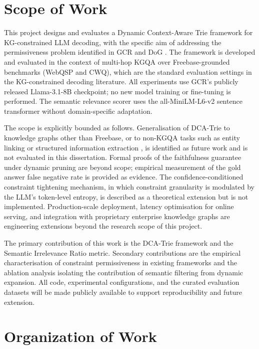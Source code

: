 \section{Scope of Work}

This project designs and evaluates a Dynamic Context-Aware Trie framework for KG-constrained LLM decoding, with the specific aim of addressing the permissiveness problem identified in GCR \citep{luo2024gcr} and DoG \citep{li2024dog}. The framework is developed and evaluated in the context of multi-hop KGQA over Freebase-grounded benchmarks (WebQSP and CWQ), which are the standard evaluation settings in the KG-constrained decoding literature. All experiments use GCR's publicly released Llama-3.1-8B checkpoint; no new model training or fine-tuning is performed. The semantic relevance scorer uses the all-MiniLM-L6-v2 sentence transformer \citep{reimers2019sentence} without domain-specific adaptation.

The scope is explicitly bounded as follows. Generalisation of DCA-Trie to knowledge graphs other than Freebase, or to non-KGQA tasks such as entity linking \citep{decao2021autoregressive} or structured information extraction \citep{dunn2022structured}, is identified as future work and is not evaluated in this dissertation. Formal proofs of the faithfulness guarantee under dynamic pruning are beyond scope; empirical measurement of the gold answer false negative rate is provided as evidence. The confidence-conditioned constraint tightening mechanism, in which constraint granularity is modulated by the LLM's token-level entropy, is described as a theoretical extension but is not implemented. Production-scale deployment, latency optimisation for online serving, and integration with proprietary enterprise knowledge graphs are engineering extensions beyond the research scope of this project.

The primary contribution of this work is the DCA-Trie framework and the Semantic Irrelevance Ratio metric. Secondary contributions are the empirical characterisation of constraint permissiveness in existing frameworks and the ablation analysis isolating the contribution of semantic filtering from dynamic expansion. All code, experimental configurations, and the curated evaluation datasets will be made publicly available to support reproducibility and future extension.

\section{Organization of Work}

